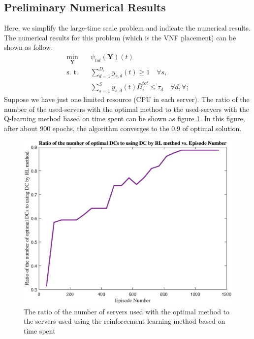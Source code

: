 \documentclass{article}
\begin{document}
\subsection{Preliminary Numerical Results}
Here, we simplify the large-time scale problem and indicate the numerical results.
The numerical results for this problem (which is the VNF placement) can be shown as follow. 
\begin{subequations}
	\begin{alignat}{4}
		\min\limits_{\boldsymbol{Y} }   \quad &   \psi_{tot}(\boldsymbol{Y})(t)\\
		\text{s. t.} \quad & \textstyle \sum_{d=1}^{D_c} y_{s,d}(t) \geq 1 \quad \forall s, \\
		&\textstyle  \sum_{s=1}^{S} y_{s,d}(t) \bar{\Omega}_{s}^{tot}  \leq   \tau_{d} \quad  \forall d, \forall ;  \label{eqomega}
	\end{alignat}
\end{subequations}
Suppose we have just one limited resource (CPU in each server). The ratio of the number of the used-servers  with the optimal method to the used-servers with the Q-learning method based on time spent can be shown as figure \ref{fig:dynamicEpoch2}. In this figure, after about 900 epochs, the algorithm converges to the 0.9 of optimal solution.
\begin{figure}[H]
	\centering
	\includegraphics[scale = 0.4]{./fig/ratio_episode2} %
	\caption{   The ratio of the number of servers used with the optimal method to the servers used using the reinforcement learning method based on time spent}
	\label{fig:dynamicEpoch2}
\end{figure}
\end{document}
